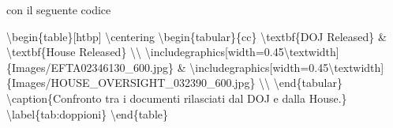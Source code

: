\documentclass[
  italian,
  a4paper,
]{article}
\newenvironment{Shaded}{\begin{snugshade}}{\end{snugshade}}
\newcommand{\NormalTok}[1]{\textcolor[rgb]{0.00,0.23,0.31}{#1}}
\begin{document}
\normalsize con il seguente codice \scriptsize

\begin{Shaded}
\begin{Highlighting}[]
\NormalTok{\textbackslash{}begin\{table\}[htbp]}
\NormalTok{\textbackslash{}centering}
\NormalTok{\textbackslash{}begin\{tabular\}\{cc\}}
\NormalTok{\textbackslash{}textbf\{DOJ Released\} \& \textbackslash{}textbf\{House Released\} \textbackslash{}\textbackslash{}}
\NormalTok{\textbackslash{}includegraphics[width=0.45\textbackslash{}textwidth]\{Images/EFTA02346130\_600.jpg\} \& \textbackslash{}includegraphics[width=0.45\textbackslash{}textwidth]\{Images/HOUSE\_OVERSIGHT\_032390\_600.jpg\} \textbackslash{}\textbackslash{}}
\NormalTok{\textbackslash{}end\{tabular\}}
\NormalTok{\textbackslash{}caption\{Confronto tra i documenti rilasciati dal DOJ e dalla House.\}}
\NormalTok{\textbackslash{}label\{tab:doppioni\}}
\NormalTok{\textbackslash{}end\{table\}}
\end{Highlighting}
\end{Shaded}

\normalsize
\end{document}
